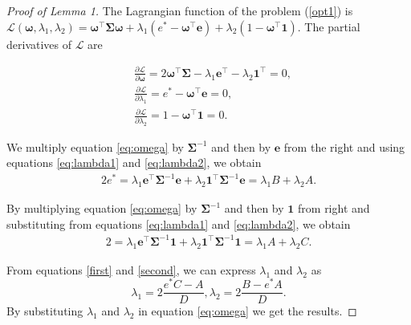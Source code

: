 \documentclass{article}
\begin{document}
    
\begin{proof}[Proof of Lemma 1]
The Lagrangian function of the problem (\ref{opt1}) is $\mathcal{L}(\boldsymbol{\omega}, \lambda_1, \lambda_2) = \boldsymbol{\omega}^\top \mathbf{\Sigma} \boldsymbol{\omega} + \lambda_1 \left( e^* - \boldsymbol{\omega}^\top \mathbf{e} \right) + \lambda_2 \left( 1 - \boldsymbol{\omega}^\top \mathbf{1} \right)$. The partial derivatives of $\mathcal{L}$ are 

\begin{align} 
&\frac{\partial \mathcal{L}}{\partial \boldsymbol{\omega}} = 2 \boldsymbol{\omega}^\top \mathbf{\Sigma} - \lambda_1 \mathbf{e^\top} - \lambda_2 \mathbf{1^\top} = 0, \label{eq:omega} \\ 
& \frac{\partial \mathcal{L}}{\partial \lambda_1} = e^* - \boldsymbol{\omega}^\top \mathbf{e} = 0, \label{eq:lambda1} \\ 
&\frac{\partial \mathcal{L}}{\partial \lambda_2} = 1 - \boldsymbol{\omega}^\top \mathbf{1} = 0. \label{eq:lambda2} 
\end{align}

We multiply equation \eqref{eq:omega} by $\mathbf{\Sigma}^{-1}$ and then by $\mathbf{e}$ from the right and using equations \eqref{eq:lambda1} and \eqref{eq:lambda2}, we obtain
\begin{equation} 
\begin{aligned} \label{first}
    2e^* = \lambda_1 \mathbf{e^\top} \mathbf{\Sigma}^{-1} \mathbf{e} + \lambda_2 \mathbf{1^\top} \mathbf{\Sigma}^{-1} \mathbf{e}
          = \lambda_1 B + \lambda_2 A.
\end{aligned}
\end{equation}

By multiplying equation \eqref{eq:omega} by $\mathbf{\Sigma}^{-1}$ and then by $\mathbf{1}$ from right and substituting from equations \eqref{eq:lambda1} and \eqref{eq:lambda2}, we obtain
\begin{equation} 
\begin{aligned} \label{second}
    2 = \lambda_1 \mathbf{e^\top} \mathbf{\Sigma}^{-1}\mathbf{1}  + \lambda_2 \mathbf{1^\top} \mathbf{\Sigma}^{-1} \mathbf{1} 
          = \lambda_1 A + \lambda_2 C.
\end{aligned}
\end{equation}


From equations \eqref{first} and \eqref{second}, we can express $\lambda_1$ and $\lambda_2$ as
\begin{equation}
    \lambda_1 = 2\frac{e^* C-A}{D}, \lambda_2 = 2\frac{B - e^* A}{D}.
\end{equation}
By substituting $ \lambda_1$ and $ \lambda_2$ in equation \eqref{eq:omega} we get the results.
\end{proof}
\end{document}
